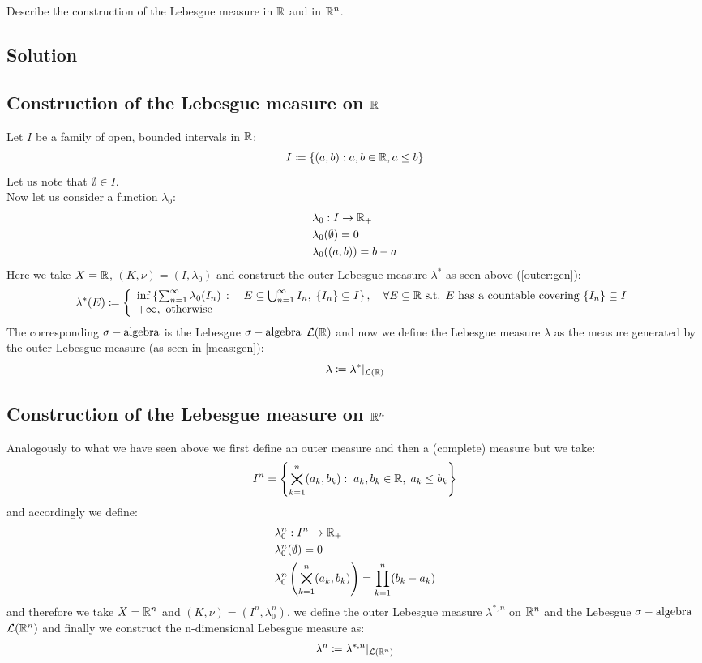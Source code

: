 
\question
Describe the construction of the Lebesgue measure in $\mathbb{R}$ and in $\mathbb{R}^n$.

\subsection*{Solution}

\subsection{Construction of the Lebesgue measure on \texorpdfstring{$\mathbb{R}$}{R}}
Let $I$ be a family of open, bounded intervals in $\mathbb{R}$:
\[
    I \coloneqq \{ (a,b) : a,b\in\mathbb{R}, a\leq b \}
\]
Let us note that $\emptyset\in I$.\\
Now let us consider a function $\lambda_0$:
\begin{align*}
     & \lambda_0 : I \to \mathbb{R}_+   \\
     & \lambda_0 (\emptyset) =0 \\
     & \lambda_0 ((a,b)) = b-a
\end{align*}
Here we take $X=\mathbb{R}$, $(K,\nu)=(I,\lambda_0)$ and construct the outer Lebesgue measure $\lambda^*$ as seen above (\ref{outer:gen}):
\[
    \lambda^*(E) \coloneqq \left\{ \begin{array}{l}
        \inf \left\{ \sum_{n=1}^{\infty} \lambda_0(I_n) \, : \quad E\subseteq \bigcup_{n=1}^{\infty} I_n ,\; \{ I_n \}\subseteq I \right\}, \quad \forall E\subseteq\mathbb{R} \text{ s.t. } E \text{ has a countable covering }\{ I_n \}\subseteq I \\
        +\infty, \text{ otherwise}
    \end{array}\right.
\]
The corresponding $\sigma-\text{algebra}$ is the Lebesgue $\sigma-\text{algebra}$ $\mathcal{L}(\mathbb{R})$ and now we define the Lebesgue measure $\lambda$ as the measure generated by the outer Lebesgue measure (as seen in \ref{meas:gen}):
\[
    \lambda \coloneqq \lambda^*|_{\mathcal{L}(\mathbb{R})}
\]

\subsection{Construction of the Lebesgue measure on \texorpdfstring{$\mathbb{R}^n$}{Rn}}
Analogously to what we have seen above we first define an outer measure and then a (complete) measure but we take:
\[
    I^n = \left\{ \bigtimes_{k=1}^{n} (a_k,b_k): \; a_k,b_k\in\mathbb{R}, \; a_k\leq b_k  \right\}
\]
and accordingly we define:
\begin{align*}
     & \lambda_0^n : I^n \to \mathbb{R}_+                                                         \\
     & \lambda_0^n (\emptyset) = 0                                                        \\
     & \lambda_0^n \left( \bigtimes_{k=1}^{n} (a_k,b_k) \right) = \prod_{k=1}^n (b_k-a_k)
\end{align*}
and therefore we take $X=\mathbb{R}^n$ and $(K,\nu)=(I^n,\lambda_0^n)$, we define the outer Lebesgue measure $\lambda^{*,n}$ on $\mathbb{R}^n$ and the Lebesgue $\sigma-\text{algebra}$ $\mathcal{L}(\mathbb{R}^n)$ and finally we construct the n-dimensional Lebesgue measure as:
\[
    \lambda^n \coloneqq \lambda^{*,n} |_{\mathcal{L}(\mathbb{R}^n)}
\]

